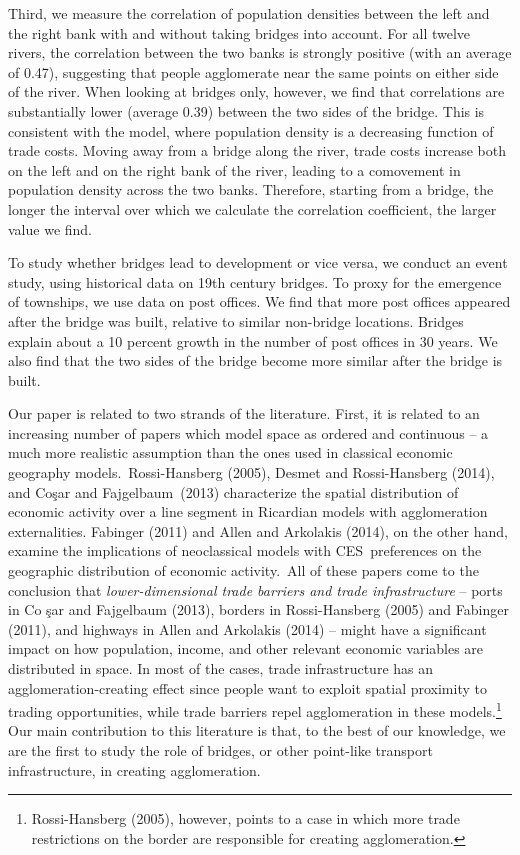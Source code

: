 \documentclass[12pt]{article}
\begin{document}
Third, we measure the correlation of population densities between the left
and the right bank with and without taking bridges into account. For all twelve
rivers, the correlation between the two banks is strongly positive (with an
average of 0.47), suggesting that people agglomerate near the same points on
either side of the river. When looking at bridges only, however, we find
that correlations are substantially lower (average 0.39) between the two
sides of the bridge. This is consistent with the model, where population
density is a decreasing function of trade costs. Moving away from a bridge
along the river, trade costs increase both on the left and on the right bank
of the river, leading to a comovement in population density across the two
banks. Therefore, starting from a bridge, the longer the interval over which
we calculate the correlation coefficient, the larger value we find.

To study whether bridges lead to development or vice versa, we conduct an event study, using historical data on 19th century bridges. To proxy for the emergence of townships, we use data on post offices. We find that more post offices appeared after the bridge was built, relative to similar non-bridge locations. Bridges explain about a 10 percent growth in the number of post offices in 30 years. We also find that the two sides of the bridge become more similar after the bridge is built.

\bigskip

Our paper is related to two strands of the literature. First, it is related
to an increasing number of papers which model space as ordered and
continuous -- a much more realistic assumption than the ones used in
classical economic geography models.\ Rossi-Hansberg (2005), Desmet and
Rossi-Hansberg (2014), and Co\c{s}ar and Fajgelbaum\ (2013) characterize the
spatial distribution of economic activity over a line segment in Ricardian
models with agglomeration externalities. Fabinger (2011) and Allen and
Arkolakis (2014), on the other hand, examine the implications of
neoclassical models with CES\ preferences on the geographic distribution of
economic activity.\ All of these papers come to the conclusion that \textit{%
lower-dimensional trade barriers and trade infrastructure} -- ports in Co%
\c{s}ar and Fajgelbaum (2013), borders in Rossi-Hansberg (2005) and Fabinger
(2011), and highways in Allen and Arkolakis (2014) -- might
have a significant impact on how population, income, and other relevant
economic variables are distributed in space. In most of the cases, trade
infrastructure has an agglomeration-creating effect since people want to
exploit spatial proximity to trading opportunities, while trade barriers
repel agglomeration in these models.\footnote{%
Rossi-Hansberg (2005), however, points to a case in which more trade
restrictions on the border are responsible for creating agglomeration.} Our
main contribution to this literature is that, to the best of our knowledge,
we are the first to study the role of bridges, or other point-like transport
infrastructure, in creating agglomeration.
\end{document}

